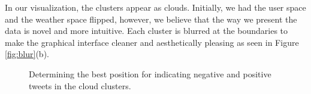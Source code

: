 \documentclass[journal]{vgtc}                %
\begin{document}
In our visualization, the clusters appear as clouds. Initially, we had the user space and the weather space flipped, however, we believe that the way we present the data is novel and more intuitive. Each cluster is blurred at the boundaries to make the graphical interface cleaner and aesthetically pleasing as seen in Figure \ref{fig:blur}(b).




\begin{figure}[htp]
  \centering
  \quad
  \quad
\caption{Determining the best position for indicating negative and positive tweets in the cloud clusters.}
\label{fig:corners}
\end{figure}
\end{document}
